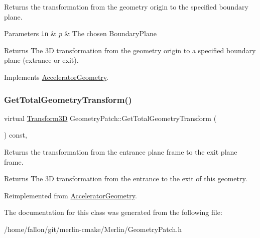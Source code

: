 Returns the transformation from the geometry origin to the specified boundary plane. 
\begin{DoxyParams}[1]{Parameters}
\mbox{\tt in}  & {\em p} & The chosen Boundary\+Plane \\
\hline
\end{DoxyParams}
\begin{DoxyReturn}{Returns}
The 3D transformation from the geometry origin to a specified boundary plane (extrance or exit). 
\end{DoxyReturn}


Implements \hyperlink{classAcceleratorGeometry_af26654f89c4bff1b516d2c6d6bb68871}{Accelerator\+Geometry}.

\mbox{\label{classGeometryPatch_a94c4c26b1a43acc6a34b29d00a229d70}} 
\subsubsection{\texorpdfstring{Get\+Total\+Geometry\+Transform()}{GetTotalGeometryTransform()}}
{\footnotesize\ttfamily virtual \hyperlink{classTransform3D}{Transform3D} Geometry\+Patch\+::\+Get\+Total\+Geometry\+Transform (\begin{DoxyParamCaption}{ }\end{DoxyParamCaption}) const\hspace{0.3cm}{\ttfamily [inline]}, {\ttfamily [virtual]}}

Returns the transformation from the entrance plane frame to the exit plane frame. \begin{DoxyReturn}{Returns}
The 3D transformation from the entrance to the exit of this geometry. 
\end{DoxyReturn}


Reimplemented from \hyperlink{classAcceleratorGeometry_a9bffb8262fc3b28195e1e25fbfb2b8ba}{Accelerator\+Geometry}.



The documentation for this class was generated from the following file\+:\begin{DoxyCompactItemize}
\item 
/home/fallon/git/merlin-\/cmake/\+Merlin/Geometry\+Patch.\+h\end{DoxyCompactItemize}

